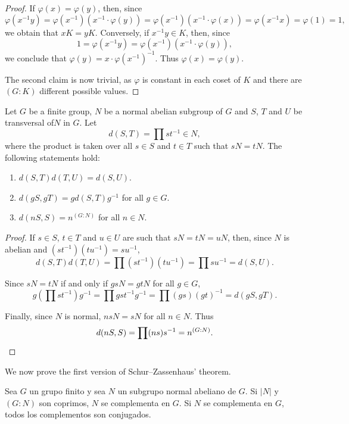 \begin{proof}
	If $\varphi(x)=\varphi(y)$, then, since 
	\[
		\varphi(x^{-1}y)
		=\varphi(x^{-1})(x^{-1}\cdot\varphi(y))
		=\varphi(x^{-1})(x^{-1}\cdot\varphi(x))
		=\varphi(x^{-1}x)=\varphi(1)
		=1,
	\]
	we obtain that $xK=yK$. Conversely, if $x^{-1}y\in K$, then, since 
	\[
	1=\varphi(x^{-1}y)=\varphi(x^{-1})(x^{-1}\cdot \varphi(y)),
	\]
	we conclude that $\varphi(y)=x\cdot\varphi(x^{-1})^{-1}$. Thus
	$\varphi(x)=\varphi(y)$.

	The second claim is now trivial, as $\varphi$ is constant in each coset of $K$ and
	there are $(G:K)$ different possible values. 
\end{proof}

\begin{lemma}
	\label{lemma:d}
	Let $G$ be a finite group, $N$ be a normal abelian subgroup of $G$ and $S$, $T$ and $U$
	be transversal of$N$ in $G$. Let  
	\[
	d(S,T)=\prod st^{-1}\in N,
	\]
	where the product is taken over all $s\in S$ and $t\in T$ such that 
	$sN=tN$. The following statements hold:
	\begin{enumerate}
		\item $d(S,T)d(T,U)=d(S,U)$.
		\item $d(gS,gT)=gd(S,T)g^{-1}$ for all $g\in G$.
		\item $d(nS,S)=n^{(G:N)}$ for all $n\in N$.
	\end{enumerate}
\end{lemma}

\begin{proof}
	If $s\in S$, $t\in T$ and $u\in U$ are such that $sN=tN=uN$, then, since $N$ is
	abelian and $(st^{-1})(tu^{-1})=su^{-1}$, 
	\[
		d(S,T)d(T,U)=\prod (st^{-1})(tu^{-1})=\prod su^{-1}=d(S,U).
	\]

	Since $sN=tN$ if and only if $gsN=gtN$ for all $g\in G$, 
	\[
	g\left(\prod st^{-1}\right)g^{-1}=\prod gst^{-1}g^{-1}=\prod (gs)(gt)^{-1}=d(gS,gT).
	\]

	Finally, since $N$ is normal, $nsN=sN$ for all $n\in N$. Thus 
	\[
		d(nS,S)=\prod (ns)s^{-1}=n^{(G:N)}.\qedhere
	\]
\end{proof}

We now prove the first version of Schur--Zassenhaus' theorem. 

\begin{theorem}
	\label{thm:SchurZassenhaus:abelian}
	Sea $G$ un grupo finito y sea $N$ un subgrupo normal abeliano de $G$. Si
	$|N|$ y $(G:N)$ son coprimos, $N$ se complementa en $G$. Si $N$ se
	complementa en $G$, todos los complementos son conjugados.  
\end{theorem}


